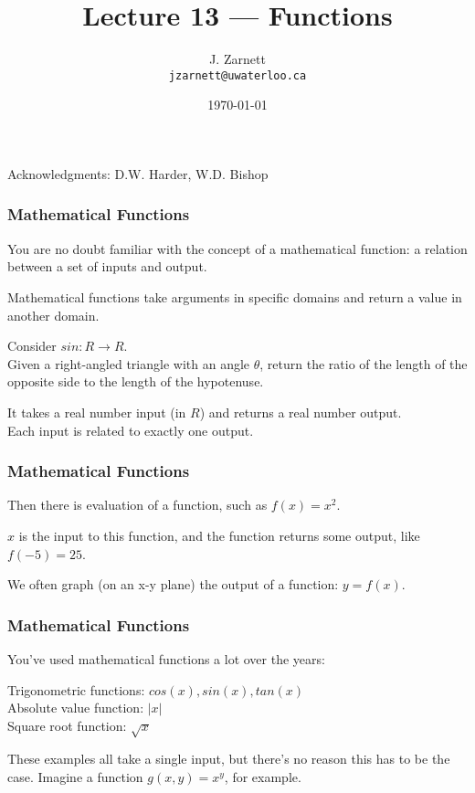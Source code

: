 

\title{Lecture 13 --- Functions }
\author{J. Zarnett\\
\texttt{jzarnett@uwaterloo.ca}}
\date{\today}



\begin{frame}
  \titlepage
  
  \begin{center}
  \small{Acknowledgments: D.W. Harder, W.D. Bishop}
  \end{center}
 \end{frame}
 
\begin{frame}
\frametitle{Mathematical Functions}

You are no doubt familiar with the concept of a mathematical function: a relation between a set of inputs and output.

Mathematical functions take arguments in specific domains and return a value in another domain.

Consider $sin : R \rightarrow R$.\\
\quad Given a right-angled triangle with an angle $\theta$, return the ratio of the length of the opposite side to the length of the hypotenuse.


It takes a real number input  (in $R$) and returns a real number output.\\
\quad Each input is related to exactly one output. 

\end{frame}

\begin{frame}
\frametitle{Mathematical Functions}

Then there is evaluation of a function, such as $f(x) = x^{2}$.

$x$ is the input to this function, and the function returns some output, like $f(-5) = 25$. 

We often graph (on an x-y plane) the output of a function: $y = f(x)$.

\end{frame}

\begin{frame}
\frametitle{Mathematical Functions}

You've used mathematical functions a lot over the years:

Trigonometric functions: $cos(x), sin(x), tan(x)$\\
Absolute value function: $|x|$\\
Square root function: $\sqrt{x}$

These examples all take a single input, but there's no reason this has to be the case. Imagine a function $g(x, y) = x^{y}$, for example.

\end{frame}

